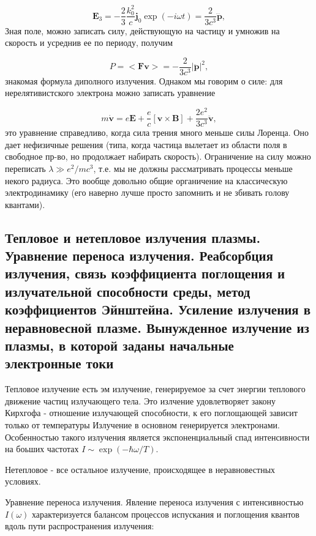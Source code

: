 \documentclass[10pt, a4paper]{article}
\begin{document}
\begin{equation}
    \mathbf{E}_3=-\frac{2}{3}\frac{k_0^2}{c}\mathbf{j}_0\exp(-i\omega t) = \frac{2}{3c^3} \dddot{\mathbf{p}},
\end{equation}
Зная поле, можно записать силу, действующую на частицу и умножив на скорость и усреднив ее по периоду, получим

\begin{equation}
    P=<\mathbf{F}\mathbf{v}>=-\frac{2}{3c^3}|\ddot{\mathbf{p}}|^2,
\end{equation}
знакомая формула диполного излучения. Однаком мы говорим о силе: для нерелятивистского электрона можно записать уравнение

\begin{equation}
    m\dot{\mathbf{v}}=e\mathbf{E}+\frac{e}{c}[\mathbf{v}\times\mathbf{B}] + \frac{2e^2}{3c^3}\ddot{\mathbf{v}},
\end{equation}
это уравнение справедливо, когда сила трения много меньше силы Лоренца. Оно дает нефизичные решения (типа, когда
частица вылетает из области поля в свободное пр-во, но продолжает набирать скорость). Ограничение на силу можно
переписать $\lambda \gg e^2/mc^3$, т.е. мы не должны рассматривать процессы меньше некого радиуса. Это вообще 
довольно общие органичение на классическую электродинамику (его наверно лучше просто запомнить и не збивать голову
квантами).

\subsection{Тепловое и нетепловое излучения плазмы. Уравнение переноса излучения. Реабсорбция излучения, связь коэффициента поглощения и излучательной способности среды, метод коэффициентов Эйнштейна. Усиление излучения в неравновесной плазме. Вынужденное излучение из плазмы, в которой заданы начальные электронные токи}

Тепловое излучение есть эм излучение, генерируемое за счет энергии теплового движение частиц излучающего тела. Это
излчение удовлетворяет закону Кирхгофа - отношение излучающей способности, к его поглощающей зависит только от температуры
Излучение в основном генерируется электронами. Особенностью такого излучения является экспоненциальный спад
интенсивности на боьших частотах $I\sim \exp(-\hbar\omega/T)$.

Нетепловое - все остальное излучение, происходящее в неравновестных условиях.

Уравнение переноса излучения.
Явление переноса излучения с интенсивностью $I(\omega)$ характеризуется балансом процессов испускания и поглощения
квантов вдоль пути распространения излучения:
\end{document}
